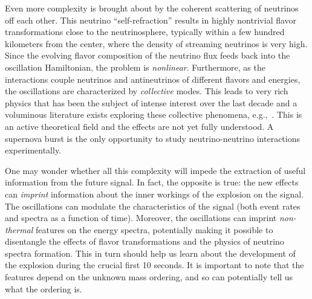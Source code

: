 Even more complexity is brought about by the coherent scattering of neutrinos off each other. This neutrino ``self-refraction'' 
 results in highly nontrivial flavor transformations close to the neutrinosphere, typically within a few hundred kilometers from the center, where the density of streaming neutrinos is very high. Since the evolving flavor composition of the neutrino flux feeds back into the oscillation Hamiltonian, the problem is \emph{nonlinear}. Furthermore, as the interactions couple neutrinos and antineutrinos of different flavors and energies, the oscillations are characterized by \emph{collective} modes.    This leads to very rich physics that has been the subject of intense interest over the last decade and a voluminous literature exists exploring these collective phenomena,
e.g.,~\cite{Duan:2005cp,Fogli:2007bk,Raffelt:2007cb,Raffelt:2007xt,EstebanPretel:2008ni,Duan:2009cd,Dasgupta:2009mg,Duan:2010bg,Duan:2010bf,Wu:2014kaa}.  This is an active theoretical field and the effects are not yet fully understood. A supernova burst is the only opportunity to study neutrino-neutrino interactions experimentally.


One may wonder whether all this complexity will impede the extraction
of useful information from the future signal. In fact, the opposite is
true: the new effects can \emph{imprint} information about the inner
workings of the explosion on the signal. The oscillations can modulate
the characteristics of the signal (both event rates and spectra as a
function of time).
Moreover, the oscillations can imprint \emph{non-thermal} features on the energy spectra, potentially making it possible to disentangle the effects of flavor transformations and the physics of neutrino spectra formation. This in turn should help us learn about the development of the explosion during the crucial first 10 seconds.   It is important to note that the features depend on the unknown mass ordering, and so can potentially tell us what the ordering is.

